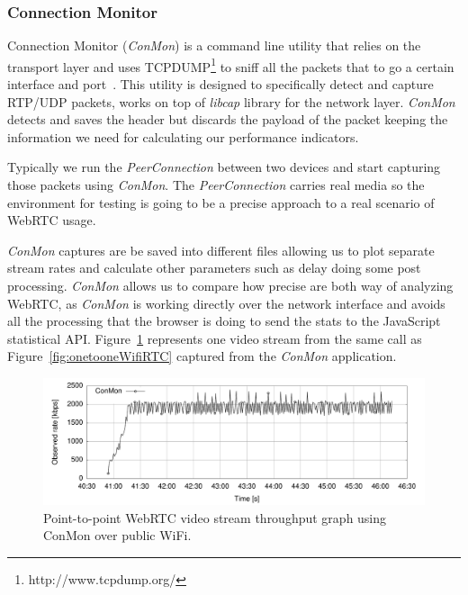 \subsubsection{Connection Monitor}

Connection Monitor ({\it ConMon}) is a command line utility that relies on the transport layer and uses TCPDUMP\footnote{http://www.tcpdump.org/} to sniff all the packets that to go a certain interface and port~\cite{singhConMon}. This utility is designed to specifically detect and capture RTP/UDP packets, works on top of {\it libcap} library for the network layer. {\it ConMon} detects and saves the header but discards the payload of the packet keeping the information we need for calculating our performance indicators.

Typically we run the {\it PeerConnection} between two devices and start capturing those packets using {\it ConMon}. The {\it PeerConnection} carries real media so the environment for testing is going to be a precise approach to a real scenario of WebRTC usage.

{\it ConMon} captures are be saved into different files allowing us to plot separate stream rates and calculate other parameters such as delay doing some post processing. {\it ConMon} allows us to compare how precise are both way of analyzing WebRTC, as {\it ConMon} is working directly over the network interface and avoids all the processing that the browser is doing to send the stats to the JavaScript statistical API. Figure~\ref{fig:onetooneWifiRTCConMon} represents one video stream from the same call as Figure~\ref{fig:onetooneWifiRTC} captured from the {\it ConMon} application.

 \begin{figure}[h]
  \centering
    \includegraphics[width=1\textwidth]{./figures/onetooneWiFiConMon.pdf}
      \caption[Point-to-point WebRTC video stream throughput graph using ConMon over public WiFi]{Point-to-point WebRTC video stream throughput graph using ConMon over public WiFi.}
	\label{fig:onetooneWifiRTCConMon}
\end{figure}


